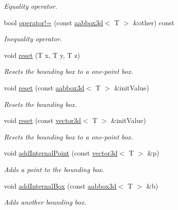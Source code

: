 \begin{DoxyCompactItemize}
\begin{DoxyCompactList}\small\item\em Equality operator. \end{DoxyCompactList}\item 
bool \hyperlink{classirr_1_1core_1_1aabbox3d_a985eec4fb632d7c8ef5a5577209690b3}{operator!=} (const \hyperlink{classirr_1_1core_1_1aabbox3d}{aabbox3d}$<$ T $>$ \&other) const
\begin{DoxyCompactList}\small\item\em Inequality operator. \end{DoxyCompactList}\item 
void \hyperlink{classirr_1_1core_1_1aabbox3d_afc718e96ed11aa71a30311d32bfc885a}{reset} (T x, T y, T z)
\begin{DoxyCompactList}\small\item\em Resets the bounding box to a one-\/point box. \end{DoxyCompactList}\item 
void \hyperlink{classirr_1_1core_1_1aabbox3d_a5f7139087de60b4c16b5df015ade1cba}{reset} (const \hyperlink{classirr_1_1core_1_1aabbox3d}{aabbox3d}$<$ T $>$ \&init\+Value)
\begin{DoxyCompactList}\small\item\em Resets the bounding box. \end{DoxyCompactList}\item 
void \hyperlink{classirr_1_1core_1_1aabbox3d_af777a607745b2bd3f4390dfee8263944}{reset} (const \hyperlink{classirr_1_1core_1_1vector3d}{vector3d}$<$ T $>$ \&init\+Value)
\begin{DoxyCompactList}\small\item\em Resets the bounding box to a one-\/point box. \end{DoxyCompactList}\item 
void \hyperlink{classirr_1_1core_1_1aabbox3d_a49e3765fd2f40a115f8f28bd74d62ccf}{add\+Internal\+Point} (const \hyperlink{classirr_1_1core_1_1vector3d}{vector3d}$<$ T $>$ \&p)
\begin{DoxyCompactList}\small\item\em Adds a point to the bounding box. \end{DoxyCompactList}\item 
void \hyperlink{classirr_1_1core_1_1aabbox3d_a7ccc210a3fb0ce82765d28f2047942c5}{add\+Internal\+Box} (const \hyperlink{classirr_1_1core_1_1aabbox3d}{aabbox3d}$<$ T $>$ \&b)
\begin{DoxyCompactList}\small\item\em Adds another bounding box. \end{DoxyCompactList}\item 

\end{DoxyCompactItemize}
